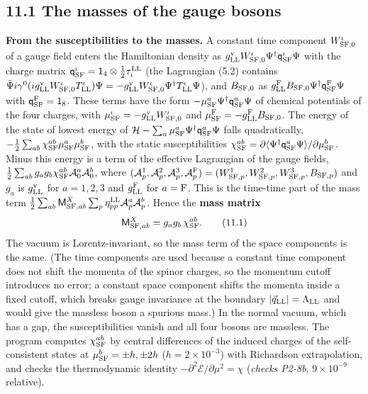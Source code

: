 \documentclass[
  10pt,
]{article}
\begin{document}
\hypertarget{the-masses-of-the-gauge-bosons}{%
\subsection{11.1 The masses of the gauge
bosons}\label{the-masses-of-the-gauge-bosons}}

\textbf{From the susceptibilities to the masses.} A constant time
component \(W^\iota_{{\rm SF},0}\) of a gauge field enters the
Hamiltonian density as
\(g^{\rm v}_{\rm LL}W^\iota_{{\rm SF},0}\Psi^\dagger\mathsf q^\iota_{\rm SF}\Psi\)
with the charge matrix
\(\mathsf q^\iota_{\rm SF}=\mathsf 1_4\otimes\tfrac12\tau^{\rm LL}_\iota\)
(the Lagrangian (5.2) contains
\(\bar\Psi i\gamma^0(ig^{\rm v}_{\rm LL}W^\iota_{{\rm SF},0}T^\iota_{\rm LL})\Psi=-g^{\rm v}_{\rm LL}W^\iota_{{\rm SF},0}\Psi^\dagger T^\iota_{\rm LL}\Psi\)),
and \(B_{{\rm SF},0}\) as
\(g^{\rm F}_{\rm LL}B_{{\rm SF},0}\Psi^\dagger\mathsf q^{\rm F}_{\rm SF}\Psi\)
with \(\mathsf q^{\rm F}_{\rm SF}=\mathsf 1_8\). These terms have the
form \(-\mu^a_{\rm SF}\Psi^\dagger\mathsf q^a_{\rm SF}\Psi\) of chemical
potentials of the four charges, with
\(\mu^\iota_{\rm SF}=-g^{\rm v}_{\rm LL}W^\iota_{{\rm SF},0}\) and
\(\mu^{\rm F}_{\rm SF}=-g^{\rm F}_{\rm LL}B_{{\rm SF},0}\). The energy
of the state of lowest energy of
\(\mathcal H-\sum_a\mu^a_{\rm SF}\Psi^\dagger\mathsf q^a_{\rm SF}\Psi\)
falls quadratically,
\(-\tfrac12\sum_{ab}\chi^{ab}_{\rm SF}\mu^a_{\rm SF}\mu^b_{\rm SF}\),
with the static susceptibilities
\(\chi^{ab}_{\rm SF}=\partial\langle\Psi^\dagger\mathsf q^a_{\rm SF}\Psi\rangle/\partial\mu^b_{\rm SF}\).
Minus this energy is a term of the effective Lagrangian of the gauge
fields,
\(\tfrac12\sum_{ab}g_ag_b\chi^{ab}_{\rm SF}\mathcal A^a_0\mathcal A^b_0\),
where
\((\mathcal A^1_p,\mathcal A^2_p,\mathcal A^3_p,\mathcal A^{\rm F}_p)=(W^1_{{\rm SF},p},W^2_{{\rm SF},p},W^3_{{\rm SF},p},B_{{\rm SF},p})\)
and \(g_a\) is \(g^{\rm v}_{\rm LL}\) for \(a=1,2,3\) and
\(g^{\rm F}_{\rm LL}\) for \(a={\rm F}\). This is the time-time part of
the mass term
\(\tfrac12\sum_{ab}\mathsf M^X_{{\rm SF},ab}\sum_p\eta^{\rm LL}_{pp}\mathcal A^a_p\mathcal A^b_p\).
Hence the \textbf{mass matrix}
\[\mathsf M^X_{{\rm SF},ab}=g_ag_b\,\chi^{ab}_{\rm SF}.\tag{11.1}\] The
vacuum is Lorentz-invariant, so the mass term of the space components is
the same. (The time components are used because a constant time
component does not shift the momenta of the spinor charges, so the
momentum cutoff introduces no error; a constant space component shifts
the momenta inside a fixed cutoff, which breaks gauge invariance at the
boundary \(\lvert\vec q_{\rm LL}\rvert=\Lambda_{\rm LL}\) and would give
the massless boson a spurious mass.) In the normal vacuum, which has a
gap, the susceptibilities vanish and all four bosons are massless. The
program computes \(\chi^{ab}_{\rm SF}\) by central differences of the
induced charges of the self-consistent states at
\(\mu^b_{\rm SF}=\pm h,\pm2h\) (\(h=2\times10^{-3}\)) with Richardson
extrapolation, and checks the thermodynamic identity
\(-\partial^2\mathcal E/\partial\mu^2=\chi\) (\emph{checks P2-8b},
\(9\times10^{-9}\) relative).
\end{document}
